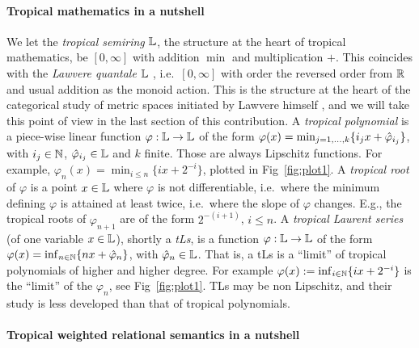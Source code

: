 \documentclass[submission,%
]{eptcs}
\begin{document}
\paragraph{Tropical mathematics in a nutshell}

We let the \emph{tropical semiring}  $\mathbb{L}$, the structure at the heart of tropical mathematics, be $[0,\infty]$ with addition $\min$ and multiplication $+$.
This coincides with the \emph{Lawvere quantale} $\mathbb{L}$ \cite{Hofmann2014, Stubbe2014}, i.e.\ $[0,\infty]$ with order the reversed order from $\mathbb{R}$ and usual addition as the monoid action. 
This is the structure at the heart of the categorical study of metric spaces initiated by Lawvere himself \cite{Lawvere1973}, and we will take this point of view in the last section of this contribution.
A \emph{tropical polynomial} is a piece-wise linear function $\varphi:\mathbb{L}\to \mathbb{L}$ of the form $\varphi(x)=\min_{j=1,\dots,k}\{i_{j}x+\hat{\varphi}_{i_{j}}\}$, with $i_{j}\in\mathbb{N}$, $\hat{\varphi}_{i_{j}}\in\mathbb{L}$ and $k$ finite.
Those are always Lipschitz functions.
For example, $\varphi_{n}(x)=\min_{i\leq n}\{ix+2^{-i}\}$, plotted in Fig~\ref{fig:plot1}.
A \emph{tropical root} of $\varphi$ is a point $x\in \mathbb{L}$ where $\varphi$ is not differentiable, i.e.\ where the minimum defining $\varphi$ is attained at least twice, i.e.~where the slope of $\varphi$ changes. E.g., the tropical roots of $\varphi_{n+1}$ are of the form $2^{-(i+1)}$, $i \leq n$.
A \emph{tropical Laurent series} (of one variable $x\in\mathbb{L}$), shortly a \emph{tLs}, is a function $\varphi:\mathbb{L}\to \mathbb{L}$ of the form $\varphi(x)=\inf_{n\in\mathbb{N}}\{nx+\hat{\varphi}_{n}\}$, with $\hat{\varphi}_{n}\in\mathbb{L}$.
That is, a tLs is a ``limit'' of tropical polynomials of higher and higher degree.
For example $\varphi(x):=\inf_{i\in\mathbb{N}}\{ix+2^{-i}\}$ %
is the ``limit'' of the $\varphi_{n}$, see Fig~\ref{fig:plot1}. %
TLs may be non Lipschitz, and their study is less developed than that of tropical polynomials.

\paragraph{Tropical weighted relational semantics in a nutshell}
\end{document}

